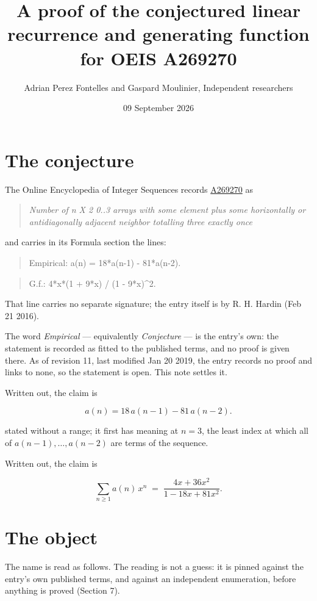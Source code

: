 \documentclass[11pt]{article}
\title{A proof of the conjectured linear recurrence and generating function for OEIS A269270}
\author{Adrian Perez Fontelles and Gaspard Moulinier, Independent researchers}
\date{09 September 2026}
\theoremstyle{definition}
\begin{document}
\maketitle
\section{The conjecture}

The Online Encyclopedia of Integer Sequences records \href{https://oeis.org/A269270}{A269270} as

\begin{quote}\itshape Number of n X 2 0..3 arrays with some element plus some horizontally or antidiagonally adjacent neighbor totalling three exactly once\end{quote}

and carries in its Formula section the lines:

\begin{quote}\ttfamily Empirical: a(n) = 18*a(n-1) - 81*a(n-2).\end{quote}

\begin{quote}\ttfamily G.f.: 4*x*(1 + 9*x) / (1 - 9*x)\textasciicircum{}2.\end{quote}

That line carries no separate signature; the entry itself is by R. H. Hardin (Feb 21 2016).

The word {\itshape Empirical} --- equivalently {\itshape Conjecture} --- is the entry's own: the statement is recorded as fitted to the published terms, and no proof is given there. As of revision 11, last modified Jan 20 2019, the entry records no proof and links to none, so the statement is open. This note settles it.

Written out, the claim is

\[a(n) = 18\,a(n-1) - 81\,a(n-2).\]

stated without a range; it first has meaning at $n = 3$, the least index at which all of $a(n-1),\dots,a(n-2)$ are terms of the sequence.

Written out, the claim is

\[\sum_{n \ge 1} a(n)\,x^n \;=\; \frac{4x + 36x^{2}}{1 - 18x + 81x^{2}}.\]

\section{The object}

The name is read as follows. The reading is not a guess: it is pinned against the entry's own published terms, and against an independent enumeration, before anything is proved (Section 7).
\end{document}
